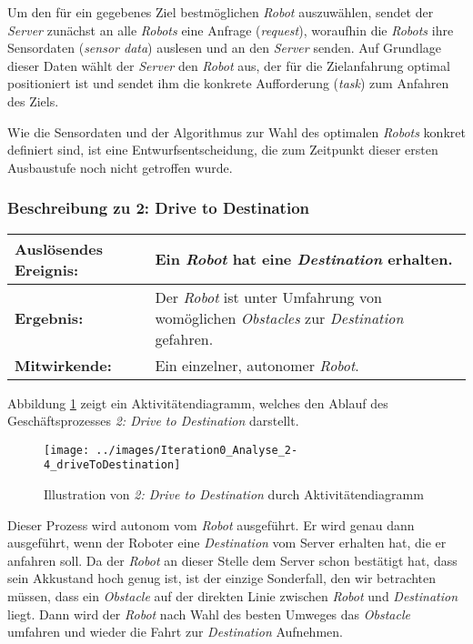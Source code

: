 \documentclass[includeheaders]{scrartcl}
\begin{document}
			Um den für ein gegebenes Ziel bestmöglichen \emph{Robot} auszuwählen, sendet
			der \emph{Server} zunächst an alle \emph{Robots} eine Anfrage (\emph{request}),
			woraufhin die \emph{Robots} ihre Sensordaten (\emph{sensor data}) auslesen und
			an den \emph{Server} senden. Auf Grundlage dieser Daten wählt der \emph{Server} den
			\emph{Robot} aus, der für die Zielanfahrung optimal positioniert ist und
			sendet ihm die konkrete Aufforderung (\emph{task}) zum Anfahren des
			Ziels.

			Wie die Sensordaten und der Algorithmus zur Wahl des optimalen \emph{Robots}
			konkret definiert sind, ist eine Entwurfsentscheidung, die zum Zeitpunkt
			dieser ersten Ausbaustufe noch nicht getroffen wurde.

			\subsubsection*{Beschreibung zu 2: Drive to Destination}

			\begin{table}[H]
				\centering
				\begin{tabularx}{\textwidth}{@{}p{3cm}X@{}}
				\toprule
				\textbf{Auslösendes Ereignis:} & Ein \emph{Robot} hat eine \emph{Destination} erhalten.\\ \midrule
				\textbf{Ergebnis:} & Der \emph{Robot} ist unter Umfahrung von womöglichen \emph{Obstacles} zur \emph{Destination} gefahren.\\ \midrule
				\textbf{Mitwirkende:} &	Ein einzelner, autonomer \emph{Robot}. \\
				\bottomrule
				\end{tabularx}
				\label{tab:2-4-drive-to-destination}
			\end{table}

			Abbildung \ref{fig:2-4-drive-to-destination-aktivitaetendiagramm} zeigt ein Aktivitätendiagramm, welches den Ablauf des Geschäftsprozesses \emph{2: Drive to Destination} darstellt.

			\begin{figure}[H]
				\centering
				\texttt{[image: ../images/Iteration0\_Analyse\_2-4\_driveToDestination]}
				\caption{Illustration von \emph{2: Drive to Destination} durch Aktivitätendiagramm}
				\label{fig:2-4-drive-to-destination-aktivitaetendiagramm}
			\end{figure}

			Dieser Prozess wird autonom vom \emph{Robot} ausgeführt. Er wird genau
			dann ausgeführt, wenn der Roboter eine \emph{Destination} vom Server
			erhalten hat, die er anfahren soll. Da der \emph{Robot} an dieser Stelle
			dem Server schon bestätigt hat, dass sein Akkustand hoch genug ist, ist
			der einzige Sonderfall, den wir betrachten müssen, dass ein
			\emph{Obstacle} auf der direkten Linie zwischen \emph{Robot} und
			\emph{Destination} liegt. Dann wird der \emph{Robot} nach Wahl des
			besten Umweges das \emph{Obstacle} umfahren und wieder die Fahrt zur
			\emph{Destination} Aufnehmen.
\end{document}
